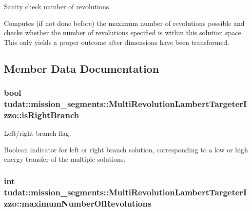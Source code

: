 Sanity check number of revolutions. 

Computes (if not done before) the maximum number of revolutions possible and checks whether the number of revolutions specified is within this solution space. This only yields a proper outcome after dimensions have been transformed. 

\subsection{Member Data Documentation}
\subsubsection[{\texorpdfstring{is\+Right\+Branch}{isRightBranch}}]{\setlength{\rightskip}{0pt plus 5cm}bool tudat\+::mission\+\_\+segments\+::\+Multi\+Revolution\+Lambert\+Targeter\+Izzo\+::is\+Right\+Branch\hspace{0.3cm}{\ttfamily [protected]}}\hypertarget{classtudat_1_1mission__segments_1_1MultiRevolutionLambertTargeterIzzo_a6da335c19c0dfd2a914ec4c08e76a01f}{}\label{classtudat_1_1mission__segments_1_1MultiRevolutionLambertTargeterIzzo_a6da335c19c0dfd2a914ec4c08e76a01f}


Left/right branch flag. 

Boolean indicator for left or right branch solution, corresponding to a low or high energy transfer of the multiple solutions. 
\subsubsection[{\texorpdfstring{maximum\+Number\+Of\+Revolutions}{maximumNumberOfRevolutions}}]{\setlength{\rightskip}{0pt plus 5cm}int tudat\+::mission\+\_\+segments\+::\+Multi\+Revolution\+Lambert\+Targeter\+Izzo\+::maximum\+Number\+Of\+Revolutions\hspace{0.3cm}{\ttfamily [protected]}}\hypertarget{classtudat_1_1mission__segments_1_1MultiRevolutionLambertTargeterIzzo_a39d81688a72b0ff52cb5e938ea5af1c4}{}\label{classtudat_1_1mission__segments_1_1MultiRevolutionLambertTargeterIzzo_a39d81688a72b0ff52cb5e938ea5af1c4}


